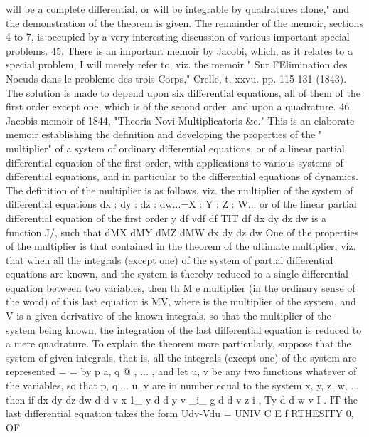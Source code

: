 \documentclass[11pt,a4paper]{book}
\begin{document}

will be a complete differential, or will be integrable by quadratures alone," and the
demonstration of the theorem is given. The remainder of the memoir, sections 4 to 7,
is occupied by a very interesting discussion of various important special problems.
45. There is an important memoir by Jacobi, which, as it relates to a special
problem, I will merely refer to, viz. the memoir " Sur FElimination des Noeuds dans
le probleme des trois Corps," Crelle, t. xxvu. pp. 115 131 (1843). The solution is
made to depend upon six differential equations, all of them of the first order except
one, which is of the second order, and upon a quadrature.
46. Jacobis memoir of 1844, "Theoria Novi Multiplicatoris &c." This is an
elaborate memoir establishing the definition and developing the properties of the
" multiplier" of a system of ordinary differential equations, or of a linear partial
differential equation of the first order, with applications to various systems of differential
equations, and in particular to the differential equations of dynamics. The definition
of the multiplier is as follows, viz. the multiplier of the system of differential equations
dx : dy : dz : dw...=X : Y : Z : W...
or of the linear partial differential equation of the first order
y df vdf df TIT df
dx dy dz dw
is a function J/, such that
dMX dMY dMZ dMW
dx dy dz dw
One of the properties of the multiplier is that contained in the theorem of the
ultimate multiplier, viz. that when all the integrals (except one) of the system of
partial differential equations are known, and the system is thereby reduced to a single
differential equation between two variables, then th M e multiplier (in the ordinary sense
of the word) of this last equation is MV, where is the multiplier of the system,
and V is a given derivative of the known integrals, so that the multiplier of the
system being known, the integration of the last differential equation is reduced to a
mere quadrature. To explain the theorem more particularly, suppose that the system
of given integrals, that is, all the integrals (except one) of the system are represented
= =
by p a, q @ , ... , and let u, v be any two functions whatever of the variables, so
that p, q,... u, v are in number equal to the system x, y, z, w, ... then if
dx dy dz dw
d d v x 1_ y d d y v _i_ g d d v z i , Ty d d w v I . IT
the last differential equation takes the form
Udv-Vdu = UNIV C E f RTHESITY
0,
OF


\end{document}
